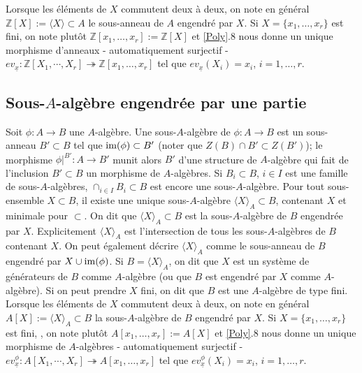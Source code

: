 \documentclass[a4paper, 12pt]{amsart}
\newcommand{\Z}{\mathbb{Z}}
\begin{document}
\noindent Lorsque les éléments de $X$ commutent deux à deux, on note en général $\Z[X]:=\langle X\rangle \subset A$ le sous-anneau de $A$ engendré par $X$. Si  $X=\lbrace x_1,\dots,x_r\rbrace $ est fini, on note plutôt $\Z[x_1,\dots,x_r]:=\Z[X]$ et \ref{Poly}.8  nous donne un unique morphisme d'anneaux - automatiquement  surjectif - $ev_{\underline{x}}:\Z[X_1,\cdots, X_r]\twoheadrightarrow \Z[x_1,\dots,x_r] $ tel que $ev_{\underline{x}}(X_i)=x_i$, $i=1,\dots, r$.   \\
 
  \subsection{Sous-$A$-algèbre engendrée par une partie}\label{SousAlg} Soit $\phi:A\rightarrow B$ une $A$-algèbre. Une sous-$A$-algèbre de $\phi:A\rightarrow B$ est un sous-anneau $B'\subset B$ tel que $\hbox{\rm im}(\phi)\subset B'$ (noter que $Z(B)\cap B'\subset Z(B')$); le morphisme $\phi|^{B'}:A\rightarrow B'$ munit alors $B'$ d'une structure de $A$-algèbre qui fait de l'inclusion $B'\subset B$ un morphisme de $A$-algèbres. Si    $B_i\subset B$, $i\in I$ est une famille de sous-$A$-algèbres, $\cap_{i\in I}B_i\subset B$  est encore une sous-$A$-algèbre. Pour tout sous-ensemble $X\subset B$, il existe 
une unique sous-$A$-algèbre $\langle X\rangle_A \subset B$, contenant $X$ et minimale pour $\subset$. On dit que $\langle X\rangle_A\subset B$ est la sous-$A$-algèbre de $B$ engendrée par $X$. Explicitement $\langle X\rangle_A$ est l'intersection de tous les sous-$A$-algèbres de $B$ contenant $X$. On peut également décrire $\langle X\rangle_A$ comme  le sous-anneau de $B$ engendré par $X\cup\hbox{\rm im}(\phi)$. Si $B=\langle X\rangle_A$, on dit que $X$ est un système de générateurs de $B$ comme $A$-algèbre (ou que $B$ est engendré par $X$ comme $A$-algèbre). Si on peut prendre $X$ fini, on dit que $B$ est une $A$-algèbre de type fini.\\

\noindent Lorsque les éléments de $X$ commutent deux à deux, on note en général $A[X]:=\langle X\rangle_A \subset B$ la sous-$A$-algèbre de $B$ engendré par $X$. Si  $X=\lbrace x_1,\dots,x_r\rbrace $ est fini, , on note plutôt $A[x_1,\dots,x_r]:=A[X]$ et  \ref{Poly}.8  nous donne un unique morphisme de $A$-algèbres - automatiquement  surjectif - $ev_{\underline{x}}^\phi:A[X_1,\cdots, X_r]\twoheadrightarrow A[x_1,\dots, x_r] $ tel que $ev^\phi_{\underline{x}}(X_i)=x_i$, $i=1,\dots, r$. \\
\end{document}
